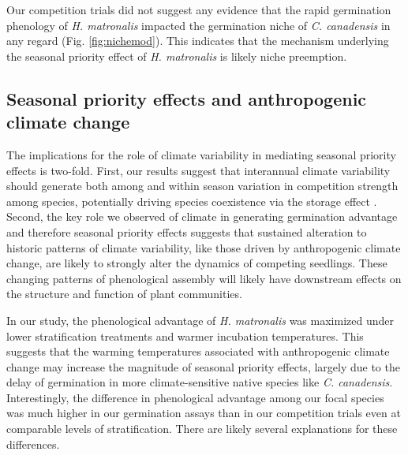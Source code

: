 \documentclass{article}[11pt]
\begin{document}
Our competition trials did not suggest any evidence that the rapid germination phenology of \textit{H. matronalis} impacted the germination niche of \textit{C. canadensis} in any regard (Fig. \ref{fig:nichemod}). This indicates that the mechanism underlying the seasonal priority effect of \textit{H. matronalis} is likely niche preemption.%

\subsection*{Seasonal priority effects and anthropogenic climate change}
The implications for the role of climate variability in mediating seasonal priority effects is two-fold. First, our results suggest that interannual climate variability should generate both among and within season variation in competition strength among species, potentially driving species coexistence via the storage effect \citep{Chesson:2003ve}. Second, the key role we observed of climate in generating germination advantage and therefore seasonal priority effects suggests that sustained alteration to historic patterns of climate variability, like those driven by anthropogenic climate change, are likely to strongly alter the dynamics of competing seedlings. These changing patterns of phenological assembly will likely have downstream effects on the structure and function of plant communities.

In our study, the phenological advantage of \textit{H. matronalis} was maximized under lower stratification treatments and warmer incubation temperatures. This suggests that the warming temperatures associated with anthropogenic climate change may increase the magnitude of seasonal priority effects, largely due to the delay of germination in more climate-sensitive native species like \textit{C. canadensis}. Interestingly, the difference in phenological advantage among our focal species was much higher in our germination assays than in our competition trials even at comparable levels of stratification. There are likely several explanations for these differences.
\end{document}
